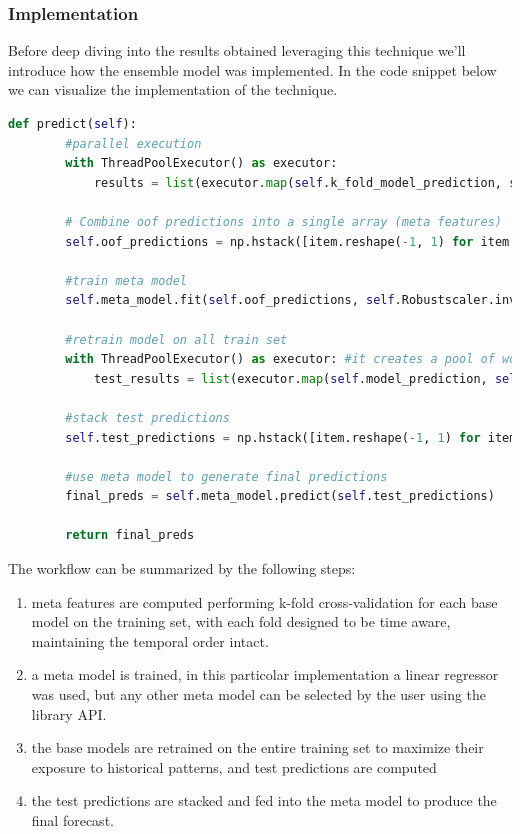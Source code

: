 \subsubsection{Implementation}
Before deep diving into the results obtained leveraging this technique we'll introduce how the ensemble model was implemented. In the code snippet below we can visualize the implementation of the technique.
\label{stacking implementation}
\begin{lstlisting}[language=Python, caption=Stacking Implementation]
def predict(self):
        #parallel execution
        with ThreadPoolExecutor() as executor: 
            results = list(executor.map(self.k_fold_model_prediction, self.trained_models)) 

        # Combine oof predictions into a single array (meta features)
        self.oof_predictions = np.hstack([item.reshape(-1, 1) for item in results])

        #train meta model
        self.meta_model.fit(self.oof_predictions, self.Robustscaler.inverse_transform(self.y_train[(self.fist_fold_idx -self.window_size):]))

        #retrain model on all train set 
        with ThreadPoolExecutor() as executor: #it creates a pool of worker threads (the with statement ensures that the pool of threads is cleaned up automatically after the execution)
            test_results = list(executor.map(self.model_prediction, self.trained_models)) 

        #stack test predictions
        self.test_predictions = np.hstack([item.reshape(-1, 1) for item in test_results])

        #use meta model to generate final predictions 
        final_preds = self.meta_model.predict(self.test_predictions)

        return final_preds
\end{lstlisting}
The workflow can be summarized by the following steps:
\begin{enumerate}
    \item meta features are computed performing k-fold cross-validation for each base model on the training set, with each fold designed to be time aware, maintaining the temporal order intact.
    \item a meta model is trained, in this particolar implementation a linear regressor was used, but any other meta model can be selected by the user using the library API. 
    \item the base models are retrained on the entire training set to maximize their exposure to historical patterns, and test predictions are computed
    \item the test predictions are stacked and fed into the meta model to produce the final forecast.
\end{enumerate}

